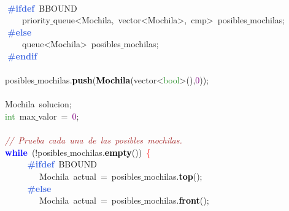 \mbox{}\ \ \ \  \\
\mbox{}\textbf{\textcolor{RoyalBlue}{\ \ \ \ \#ifdef}}\ BBOUND \\
\mbox{}\ \ \ \ \ \ \ \ \textcolor{TealBlue}{priority$\_$queue\textless{}Mochila,\ vector\textless{}Mochila\textgreater{},\ cmp\textgreater{}}\ posibles$\_$mochilas\textcolor{BrickRed}{;} \\
\mbox{}\textbf{\textcolor{RoyalBlue}{\ \ \ \ \#else}} \\
\mbox{}\ \ \ \ \ \ \ \ \textcolor{TealBlue}{queue\textless{}Mochila\textgreater{}}\ posibles$\_$mochilas\textcolor{BrickRed}{;} \\
\mbox{}\textbf{\textcolor{RoyalBlue}{\ \ \ \ \#endif}} \\
\mbox{} \\
\mbox{}\ \ \ \ posibles$\_$mochilas\textcolor{BrickRed}{.}\textbf{\textcolor{Black}{push}}\textcolor{BrickRed}{(}\textbf{\textcolor{Black}{Mochila}}\textcolor{BrickRed}{(}vector\textcolor{BrickRed}{\textless{}}\textcolor{ForestGreen}{bool}\textcolor{BrickRed}{\textgreater{}(),}\textcolor{Purple}{0}\textcolor{BrickRed}{));} \\
\mbox{}\ \ \ \  \\
\mbox{}\ \ \ \ \textcolor{TealBlue}{Mochila}\ solucion\textcolor{BrickRed}{;} \\
\mbox{}\ \ \ \ \textcolor{ForestGreen}{int}\ max$\_$valor\ \textcolor{BrickRed}{=}\ \textcolor{Purple}{0}\textcolor{BrickRed}{;} \\
\mbox{}\ \ \ \  \\
\mbox{}\ \ \ \ \textit{\textcolor{Brown}{//\ Prueba\ cada\ una\ de\ las\ posibles\ mochilas.}} \\
\mbox{}\ \ \ \ \textbf{\textcolor{Blue}{while}}\ \textcolor{BrickRed}{(!}posibles$\_$mochilas\textcolor{BrickRed}{.}\textbf{\textcolor{Black}{empty}}\textcolor{BrickRed}{())}\ \textcolor{Red}{\{} \\
\mbox{}\textbf{\textcolor{RoyalBlue}{\ \ \ \ \ \ \ \ \#ifdef}}\ BBOUND \\
\mbox{}\ \ \ \ \ \ \ \ \ \ \ \ \textcolor{TealBlue}{Mochila}\ actual\ \textcolor{BrickRed}{=}\ posibles$\_$mochilas\textcolor{BrickRed}{.}\textbf{\textcolor{Black}{top}}\textcolor{BrickRed}{();} \\
\mbox{}\textbf{\textcolor{RoyalBlue}{\ \ \ \ \ \ \ \ \#else}} \\
\mbox{}\ \ \ \ \ \ \ \ \ \ \ \ \textcolor{TealBlue}{Mochila}\ actual\ \textcolor{BrickRed}{=}\ posibles$\_$mochilas\textcolor{BrickRed}{.}\textbf{\textcolor{Black}{front}}\textcolor{BrickRed}{();} \\
